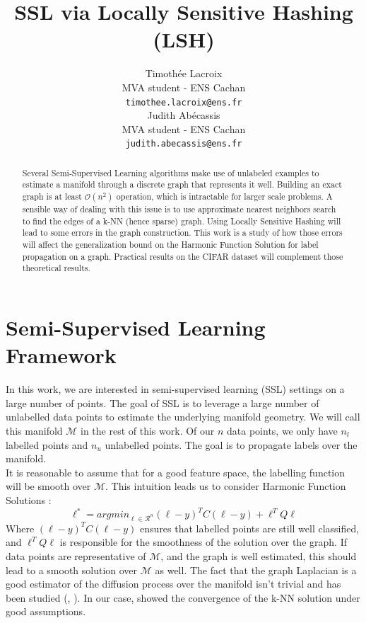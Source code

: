 \documentclass{article} %
\title{SSL via Locally Sensitive Hashing (LSH)}
\author{
Timothée Lacroix \\
MVA student - ENS Cachan\\
\texttt{timothee.lacroix@ens.fr} \\
\And
Judith Abécassis \\
MVA student - ENS Cachan \\
\texttt{judith.abecassis@ens.fr} \\
}
\begin{document}
\maketitle

\begin{abstract}
Several Semi-Supervised Learning algorithms make use of unlabeled examples to estimate a manifold through a discrete graph that represents it well. Building an exact graph is at least $\mathcal{O}(n^2)$ operation, which is intractable for larger scale problems. A sensible way of dealing with this issue is to use approximate nearest neighbors search to find the edges of a k-NN (hence sparse) graph. Using Locally Sensitive Hashing will lead to some errors in the graph construction. This work is a study of how those errors will affect the generalization bound on the Harmonic Function Solution for label propagation on a graph. Practical results on the CIFAR dataset will complement those theoretical results.
\end{abstract}


\section{Semi-Supervised Learning Framework}
In this work, we are interested in semi-supervised learning (SSL) settings on a large number of points. The goal of SSL is to leverage a large number of unlabelled data points to estimate the underlying manifold geometry. We will call this manifold $\mathcal{M}$ in the rest of this work. Of our $n$ data points, we only have $n_l$ labelled points and $n_u$ unlabelled points. The goal is to propagate labels over the manifold.\\
It is reasonable to assume that for a good feature space, the labelling function will be smooth over $\mathcal{M}$. This intuition leads us to consider Harmonic Function Solutions : 
$$\ell^* = argmin_{\ell \in \mathcal{R}^n} (\ell-y)^TC(\ell-y) + \ell^TQ\ell$$
Where $(\ell-y)^TC(\ell-y)$ ensures that labelled points are still well classified, and $\ell^TQ\ell$ is responsible for the smoothness of the solution over the graph. If data points are representative of $\mathcal{M}$, and the graph is well estimated, this should lead to a smooth solution over $\mathcal{M}$ as well. The fact that the graph Laplacian is a good estimator of the diffusion process over the manifold isn't trivial and has been studied (\cite{ting2011analysis}, \cite{hein2006graph}). In our case, \cite{ting2011analysis} showed the convergence of the k-NN solution under good assumptions.
\end{document}
